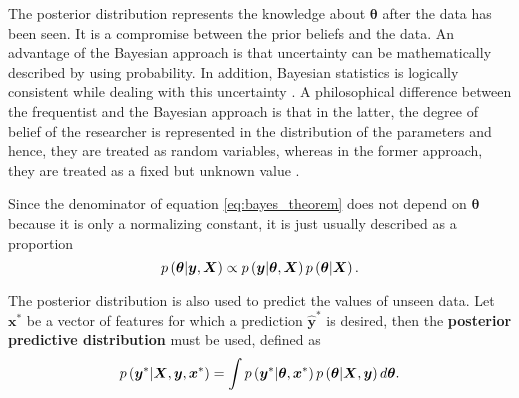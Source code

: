 The posterior distribution represents the knowledge about $\boldsymbol{\theta}$ after the data has been seen. It is a compromise between the prior beliefs and the data. An advantage of the Bayesian approach is that uncertainty can be mathematically described by using probability. In addition, Bayesian statistics is logically consistent while dealing with this uncertainty \cite{cox1946probability} \cite{cox1963algebra} \cite{jaynes2003probability} \cite{o2004advanced}. A philosophical difference between the frequentist and the Bayesian approach is that in the latter, the degree of belief of the researcher is represented in the distribution of the parameters and hence, they are treated as random variables, whereas in the former approach, they are treated as a fixed but unknown value \cite{o2004advanced}.

Since the denominator of equation \eqref{eq:bayes_theorem} does not depend on $\boldsymbol{\theta}$ because it is only a normalizing constant, it is just usually described as a proportion
\begin{equation}
  \label{eq:bayes_theorem_prop}
    p\left( \boldsymbol{\theta} | \boldsymbol{y}, \boldsymbol{X} \right) \propto p\left( \boldsymbol{y} | \boldsymbol{\theta}, \boldsymbol{X} \right) p\left( \boldsymbol{\theta} | \boldsymbol{X} \right).
\end{equation}

The posterior distribution is also used to predict the values of unseen data. Let $\boldsymbol{x}^*$ be a vector of features for which a prediction $\hat{\boldsymbol{y}}^*$ is desired, then the \textbf{posterior predictive distribution} must be used, defined as
\begin{equation}
  \label{eq:post_pred_dist}
  p\left( \boldsymbol{y}^* | \boldsymbol{X}, \boldsymbol{y}, \boldsymbol{x}^* \right) = \int p\left( \boldsymbol{y}^* | \boldsymbol{\theta}, \boldsymbol{x}^* \right) p\left( \boldsymbol{\theta} | \boldsymbol{X}, \boldsymbol{y} \right) d\boldsymbol{\theta}.
\end{equation}

